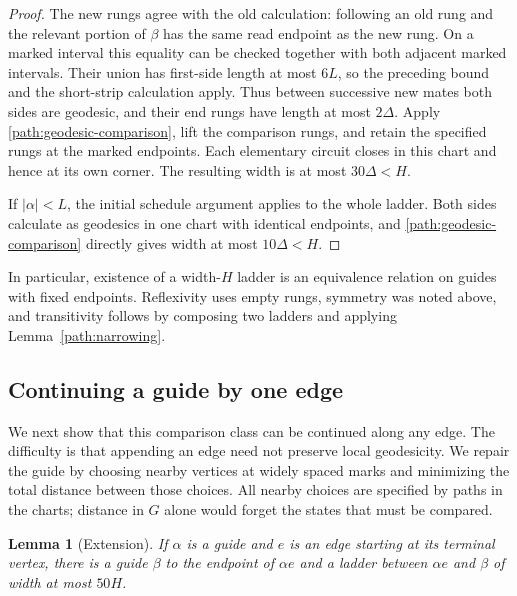 \documentclass[11pt,reqno]{amsart}
\numberwithin{equation}{section}
\newtheorem{lemma}[theorem]{Lemma}
\theoremstyle{definition}
\theoremstyle{remark}
\begin{document}
\begin{proof}
The new rungs agree with the old calculation: following an old rung and
the relevant portion of $\beta$ has the same read endpoint as the new
rung.  On a marked interval this equality can be checked together with
both adjacent marked intervals.  Their union has first-side length at
most $6L$, so the preceding bound and the short-strip calculation apply.
Thus between successive new mates both sides are geodesic, and their
end rungs have length at most $2\Delta$.  Apply
\eqref{path:geodesic-comparison}, lift the comparison rungs, and retain
the specified rungs at the marked endpoints.  Each elementary circuit
closes in this chart and hence at its own corner.  The resulting width
is at most $30\Delta<H$.

If $|\alpha|<L$, the initial schedule argument applies to the whole
ladder.  Both sides calculate as geodesics in one chart with identical
endpoints, and \eqref{path:geodesic-comparison} directly gives width at
most $10\Delta<H$.
\end{proof}

In particular, existence of a width-$H$ ladder is an equivalence relation
on guides with fixed endpoints.  Reflexivity uses empty rungs, symmetry
was noted above, and transitivity follows by composing two ladders and
applying Lemma~\ref{path:narrowing}.

\subsection{Continuing a guide by one edge}

We next show that this comparison class can be continued along any edge.
The difficulty is that appending an edge need not preserve local
geodesicity.  We repair the guide by choosing nearby vertices at widely
spaced marks and minimizing the total distance between those choices.
All nearby choices are specified by paths in the charts; distance in
$G$ alone would forget the states that must be compared.

\begin{lemma}[Extension]\label{path:extension}
If $\alpha$ is a guide and $e$ is an edge starting at its terminal vertex,
there is a guide $\beta$ to the endpoint of $\alpha e$ and a ladder
between $\alpha e$ and $\beta$ of width at most $50H$.
\end{lemma}
\end{document}
